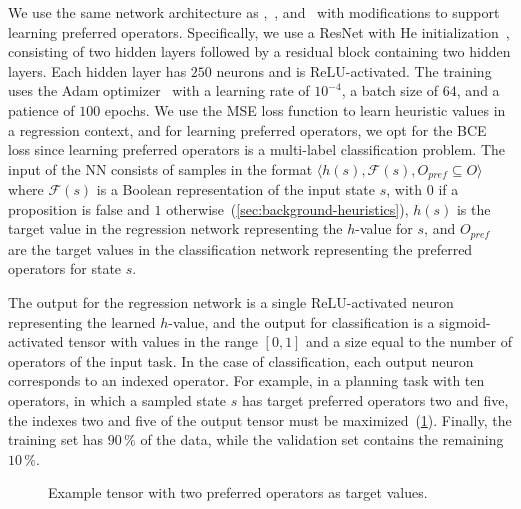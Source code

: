 \documentclass[ppgc,diss,english]{iiufrgs}
\begin{document}
We use the same network architecture as \citet{Ferber.etal/2022},~\citet{OToole/2022}, and~\citet{Bettker.etal/2022} with modifications to support learning preferred operators. Specifically, we use a ResNet with He initialization~\cite{He.etal/2015}, consisting of two hidden layers followed by a residual block containing two hidden layers.
Each hidden layer has $250$ neurons and is ReLU-activated.
The training uses the Adam optimizer~\cite{Kingma.Ba/2015} with a learning rate of $10^{-4}$, a batch size of $64$, and a patience of $100$ epochs.
We use the MSE loss function to learn heuristic values in a regression context, and for learning preferred operators, we opt for the BCE loss since learning preferred operators is a multi-label classification problem.
The input of the NN consists of samples in the format $\langle h(s), \mathcal{F}(s), O_{pref} \subseteq O\rangle$
where $\mathcal{F}(s)$ is a Boolean representation of the input state $s$, with $0$ if a proposition is false and $1$ otherwise~(\cref{sec:background-heuristics}), $h(s)$ is the target value in the regression network representing the $h$-value for $s$, and $O_{pref}$ are the target values in the classification network representing the preferred operators for state $s$.

The output for the regression network is a single ReLU-activated neuron representing the learned $h$-value, and the output for classification is a sigmoid-activated tensor with values in the range $[0, 1]$ and a size equal to the number of operators of the input task.
In the case of classification, each output neuron corresponds to an indexed operator. For example, in a planning task with ten operators, in which a sampled state $s$ has target preferred operators two and five, the indexes two and five of the output tensor must be maximized~(\cref{fig:po-tensor}). Finally, the training set has $90\,\%$ of the data, while the validation set contains the remaining $10\,\%$.

\begin{figure}[tb]
\caption[]{Example tensor with two preferred operators as target values.}
\vspace{\baselineskip}
\centering
{}
\label{fig:po-tensor}
\end{figure}
\end{document}
